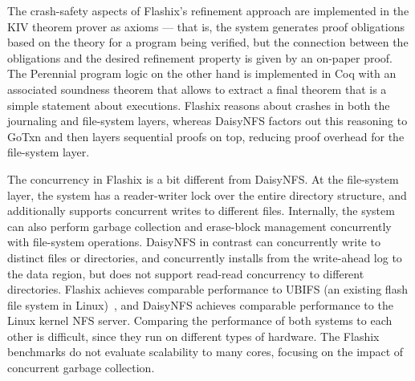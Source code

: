 The crash-safety aspects of Flashix's refinement approach are implemented in the
KIV theorem prover as axioms --- that is, the system generates proof obligations
based on the theory for a program being verified, but the connection between the
obligations and the desired refinement property is given by an on-paper proof.
The Perennial program logic on the other hand is implemented in Coq with an
associated soundness theorem that allows to extract a final theorem that is a
simple statement about executions. Flashix reasons about crashes in both the
journaling and file-system layers, whereas DaisyNFS factors out this reasoning
to GoTxn and then layers sequential proofs on top, reducing proof overhead for
the file-system layer.

The concurrency in Flashix is a bit different from DaisyNFS. At the file-system
layer, the system has a reader-writer lock over the entire directory structure,
and additionally supports concurrent writes to different files. Internally, the
system can also perform garbage collection and erase-block management
concurrently with file-system operations. DaisyNFS in contrast can concurrently
write to distinct files or directories, and concurrently installs from the
write-ahead log to the data region, but does not support read-read concurrency
to different directories. Flashix achieves comparable performance to UBIFS (an
existing flash file system in Linux)~\cite{bodenmuller:concurrent-flashix}, and
DaisyNFS achieves comparable performance to the Linux kernel NFS server.
Comparing the performance of both systems to each other is difficult, since they
run on different types of hardware. The Flashix benchmarks do not evaluate
scalability to many cores, focusing on the impact of concurrent garbage
collection.


